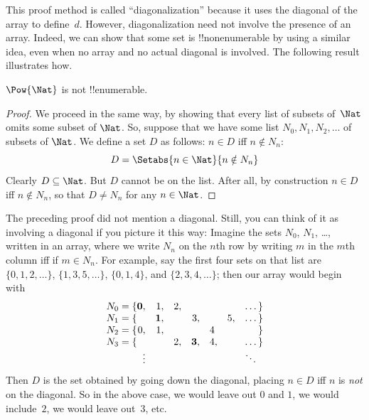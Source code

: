 \begin{explain}
This proof method is called ``diagonalization'' because it uses the
diagonal of the array to define~$d$. However, diagonalization need
not involve the presence of an array. Indeed, we can show that some set is 
!!{nonenumerable} by using a similar idea, even when no array and no
actual diagonal is involved. The following result illustrates how.
\end{explain}

\begin{thm}
$\Pow{\Nat}$ is not !!{enumerable}.
\end{thm}

\begin{proof}
We proceed in the same way, by showing that every list of subsets
of~$\Nat$ omits some subset of $\Nat$. So, suppose that we have some
list $N_0, N_1, N_2, \ldots$ of subsets of $\Nat$. We define a set $D$
as follows: $n \in D$ iff $n \notin N_{n}$:
\[
D = \Setabs{n \in \Nat}{n \notin N_n}
\]
Clearly $D\subseteq \Nat$. But $D$ cannot be on the list. After all,
by construction $n \in D$ iff $n\notin N_n$, so that $D \neq N_n$ for
any $n \in \Nat$. 
\end{proof}

\begin{explain}
The preceding proof did not mention a diagonal. Still, you can think
of it as involving a diagonal if you picture it this way: Imagine the
sets $N_0$, $N_1$, \dots, written in an array, where we write $N_n$ on
the $n$th row by writing $m$ in the $m$th column iff if $m \in N_n$.
For example, say the first four sets on that list are
$\{0,1,2,\dots\}$, $\{1, 3, 5, \dots\}$, $\{0,1,4\}$, and
$\{2,3,4,\dots\}$; then our array would begin with
\[
\begin{array}{r@{}rrrrrrr}
  N_0 = \{ & \mathbf{0}, & 1, & 2, & & & & \dots\}\\
  N_1 = \{ &  & \mathbf{1}, &  & 3, &  & 5, & \dots\}\\
  N_2 = \{ & 0, & 1, &  &  & 4\phantom{,} &  & \}\\
  N_3 = \{ &  &  & 2, & \mathbf{3}, & 4, & & \dots\}\\
  &\vdots & & & & & & \ddots\phantom{\}}
  \end{array}
\]
Then $D$ is the set obtained by going down the diagonal, placing $n
\in D$ iff $n$ is \emph{not} on the diagonal. So in the above case, we
would leave out $0$ and $1$, we would include~$2$, we would leave
out~$3$, etc.
\end{explain}

